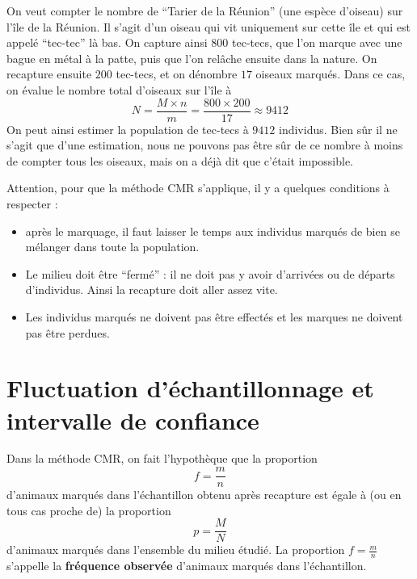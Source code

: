 \documentclass[11pt]{article}
\begin{document}
\begin{exemple}
  On veut compter le nombre de ``Tarier de la Réunion'' (une espèce d'oiseau)
  sur l'île de la Réunion. Il s'agit d'un oiseau qui vit uniquement sur cette
  île et qui est appelé ``tec-tec'' là bas. On capture ainsi $800$ tec-tecs, que
  l'on marque avec une bague en métal à la patte, puis que l'on rel\^ache
  ensuite dans la nature. On recapture ensuite $200$ tec-tecs, et on dénombre
  $17$ oiseaux marqués. Dans ce cas, on évalue le nombre total d'oiseaux sur
  l'île à
  \[
    N = \frac{M\times n}{m} = \frac{800\times 200}{17}\approx9412
  \]
  On peut ainsi estimer la population de tec-tecs à $9412$ individus. Bien sûr
  il ne s'agit que d'une estimation, nous ne pouvons pas être sûr de ce nombre à
  moins de compter tous les oiseaux, mais on a déjà dit que c'était impossible.
\end{exemple}
\begin{rmq}
  Attention, pour que la méthode CMR s'applique, il y a quelques conditions à
  respecter :
  \begin{itemize}
    \item après le marquage, il faut laisser le temps aux individus marqués de
      bien se mélanger dans toute la population.
    \item Le milieu doit être ``fermé'' : il ne doit pas y avoir d'arrivées ou
      de départs d'individus. Ainsi la recapture doit aller assez vite.
    \item Les individus marqués ne doivent pas être effectés et les marques ne
      doivent pas être perdues.
  \end{itemize}
\end{rmq}

\section{Fluctuation d'échantillonnage et intervalle de confiance}

Dans la méthode CMR, on fait l'hypothèque que la proportion
\[
  f = \frac{m}{n}
\]
d'animaux marqués dans l'échantillon obtenu après recapture est égale à (ou en
tous cas proche de) la proportion
\[
  p = \frac{M}{N}
\]
d'animaux marqués dans l'ensemble du milieu étudié. La proportion
$f=\frac{m}{n}$ s'appelle la \textbf{fréquence observée} d'animaux marqués dans
l'échantillon.
\end{document}
